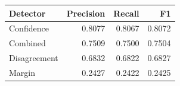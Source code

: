 \begin{tabular}{lrrr}
\toprule
Detector & Precision & Recall & F1 \\
\midrule
Confidence & 0.8077 & 0.8067 & 0.8072 \\
Combined & 0.7509 & 0.7500 & 0.7504 \\
Disagreement & 0.6832 & 0.6822 & 0.6827 \\
Margin & 0.2427 & 0.2422 & 0.2425 \\
\bottomrule
\end{tabular}
